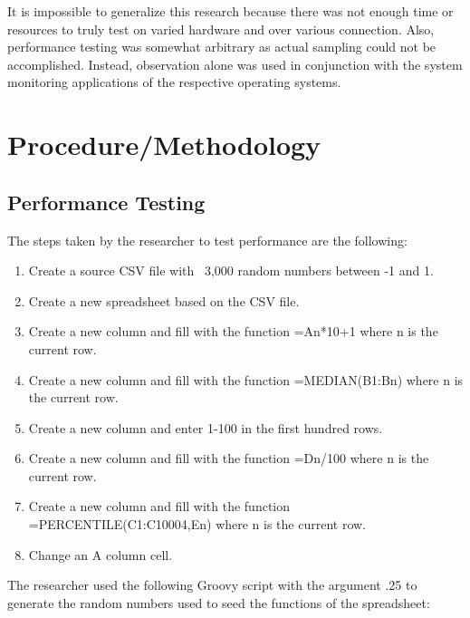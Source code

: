 It is impossible to generalize this research because there was not enough time
or resources to truly test on varied hardware and over various connection.
Also, performance testing was somewhat arbitrary as actual sampling could not be
accomplished.  Instead, observation alone was used in conjunction with the
system monitoring applications of the respective operating systems.

\section{Procedure/Methodology}

\subsection{Performance Testing}


The steps taken by the researcher to test performance are the following:

\begin{enumerate}

\item Create a source CSV file with ~3,000 random numbers between -1 and 1.

\item Create a new spreadsheet based on the CSV file.

\item Create a new column and fill with the function =An*10+1 where n is the
  current row.

\item Create a new column and fill with the function =MEDIAN(B1:Bn) where n is
  the current row.

\item Create a new column and enter 1-100 in the first hundred rows.

\item Create a new column and fill with the function =Dn/100 where n is the
  current row.

\item Create a new column and fill with the function =PERCENTILE(C1:C10004,En)
  where n is the current row.

\item Change an A column cell.

\end{enumerate}

The researcher used the following Groovy script with the argument .25 to
generate the random numbers used to seed the functions of the spreadsheet:

